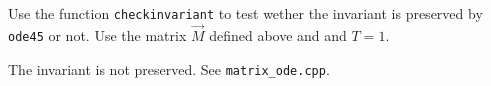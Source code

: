 \begin{problem}
\begin{subproblem}[1]
\begin{subproblem}[1]
\end{subproblem}

\begin{subproblem}[1] \label{sp:checkinvariant}
 Use the function \verb|checkinvariant| to test wether the invariant is preserved by \verb|ode45| or not. Use the matrix $\vec{M}$ defined above and
 and $T = 1$.
 
 \cprotEnv \begin{solution}
  The invariant is not preserved. See \verb|matrix_ode.cpp|.
 \end{solution}

\end{subproblem}


%  
% 
% 
%  
% 
% 
% 

\end{subproblem}
\end{problem}
